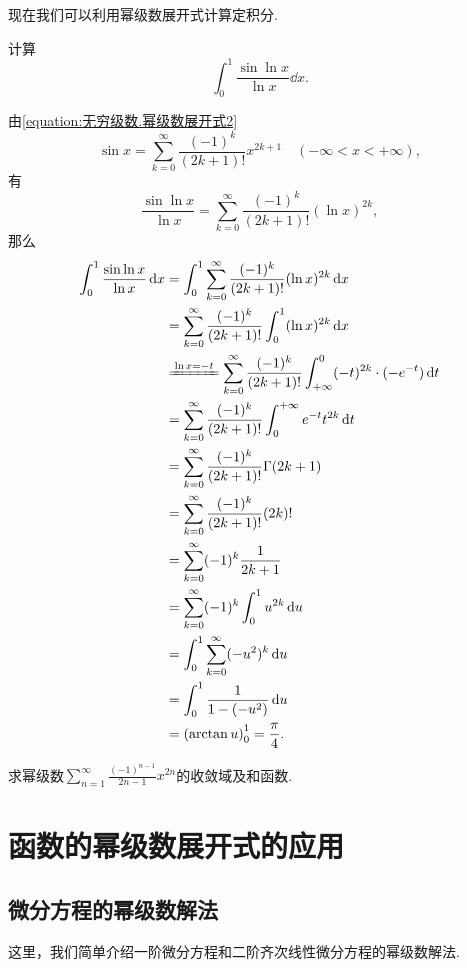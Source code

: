 现在我们可以利用幂级数展开式计算定积分.
\begin{example}
计算\[
\int_0^1 \frac{\sin\ln x}{\ln x} \dd{x}.
\]
\begin{solution}
由\cref{equation:无穷级数.幂级数展开式2} \[
\sin x = \sum\limits_{k=0}^\infty \frac{(-1)^k}{(2k+1)!} x^{2k+1}
	\quad(-\infty<x<+\infty),
\]有\[
\frac{\sin\ln x}{\ln x} = \sum\limits_{k=0}^\infty \frac{(-1)^k}{(2k+1)!} (\ln x)^{2k},
\]那么\begin{align*}
\int_0^1 \frac{\sin\ln x}{\ln x} \dd{x}
&= \int_0^1 \sum\limits_{k=0}^\infty \frac{(-1)^k}{(2k+1)!} (\ln x)^{2k} \dd{x} \\
&= \sum\limits_{k=0}^\infty \frac{(-1)^k}{(2k+1)!} \int_0^1 (\ln x)^{2k} \dd{x} \\
&\xlongequal{\ln x = -t}
	\sum\limits_{k=0}^\infty \frac{(-1)^k}{(2k+1)!}
	\int_{+\infty}^0 (-t)^{2k} \cdot (-e^{-t}) \dd{t} \\
&= \sum\limits_{k=0}^\infty \frac{(-1)^k}{(2k+1)!}
	\int^{+\infty}_0 e^{-t} t^{2k} \dd{t} \\
&= \sum\limits_{k=0}^\infty \frac{(-1)^k}{(2k+1)!} \Gamma(2k+1) \\
&= \sum\limits_{k=0}^\infty \frac{(-1)^k}{(2k+1)!} (2k)! \\
&= \sum\limits_{k=0}^\infty (-1)^k \frac{1}{2k+1} \\
&= \sum\limits_{k=0}^\infty (-1)^k \int_0^1 u^{2k} \dd{u} \\
&= \int_0^1 \sum\limits_{k=0}^\infty (-u^2)^k \dd{u} \\
&= \int_0^1 \frac{1}{1-(-u^2)} \dd{u} \\
&= \left(\arctan u\right)_0^1
= \frac{\pi}{4}.
\end{align*}
\end{solution}
\end{example}

\begin{example}
\def\s{\sum\limits_{n=1}^\infty }%
求幂级数\(\s \frac{(-1)^{n-1}}{2n-1} x^{2n}\)的收敛域及和函数.
\end{example}

\section{函数的幂级数展开式的应用}
\subsection{微分方程的幂级数解法}
这里，我们简单介绍一阶微分方程和二阶齐次线性微分方程的幂级数解法.

